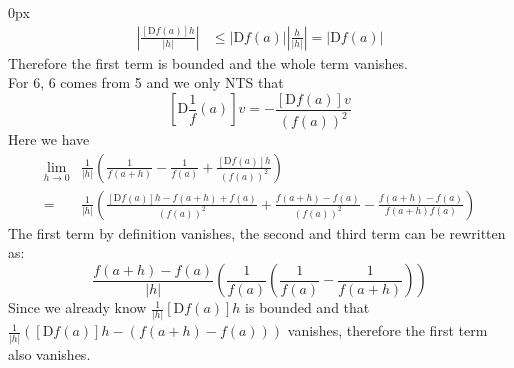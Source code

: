 \documentclass{article}
\begin{document}
\begin{addmargin}[10px]{0px}
\begin{equation*}
        \begin{split}
            \left|\frac{[\mathrm{D}f(a)]h}{|h|}\right| &\leq |\mathrm{D}f(a)| \left|\frac{h}{|h|}\right| = |\mathrm{D}f(a)|
        \end{split}
    \end{equation*}
    Therefore the first term is bounded and the whole term vanishes.\\
    For 6,
    6 comes from 5 and we only NTS that
    \begin{equation*}
        \left[\mathrm{D}\frac{1}{f}(a)\right]v = - \frac{[\mathrm{D}f(a)]v}{(f(a))^2}
    \end{equation*}
    Here we have
    \begin{equation*}
        \begin{split}
            \lim_{h \rightarrow 0}& \frac{1}{|h|}\left(
                \frac{1}{f(a+h)} - \frac{1}{f(a)} + \frac{[\mathrm{D}f(a)]h}{(f(a))^2}
            \right)\\
            =&\frac{1}{|h|}\left(
                \frac{[\mathrm{D}f(a)]h - f(a+h) + f(a)}{(f(a))^2} + \frac{f(a+h)-f(a)}{(f(a))^2} - \frac{f(a+h) - f(a)}{f(a+h)f(a)}
            \right)
        \end{split}
    \end{equation*}
    The first term by definition vanishes, the second and third term can be rewritten as:
    \begin{equation*}
        \frac{f(a+h)-f(a)}{|h|}\left(\frac{1}{f(a)}\left(\frac{1}{f(a)} - \frac{1}{f(a+h)}\right)\right)
    \end{equation*}
    Since we already know $\frac{1}{|h|}[\mathrm{D}f(a)]h$ is bounded and that $\frac{1}{|h|}\left(
        [\mathrm{D}f(a)]h - (f(a+h) - f(a))
    \right)$ vanishes, therefore the first term also vanishes.
    
\end{addmargin}
\end{document}
